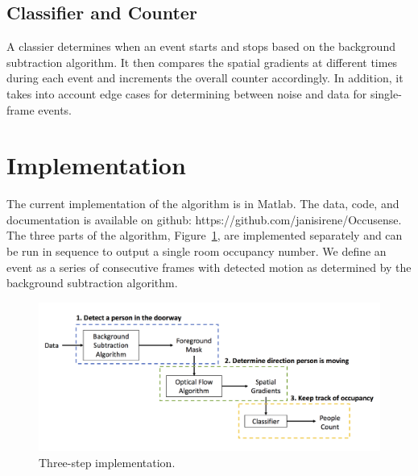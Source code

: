 \documentclass[12pt,oneside]{article} %
\begin{document}
\subsection{Classifier and Counter}
A classier determines when an event starts and stops based on the background subtraction algorithm. It then compares the spatial gradients at different times during each event and increments the overall counter accordingly. In addition, it takes into account edge cases for determining between noise and data for single-frame events.

\newpage

\section{Implementation}  %
The current implementation of the algorithm is in Matlab. The data, code, and documentation is available
on github: https://github.com/janisirene/Occusense.
 The three parts of the algorithm, Figure~\ref{threestep},
are implemented
separately and can be run in sequence to output a single room occupancy number. We define an event as a series of consecutive frames with detected motion as determined by the background subtraction algorithm.
\begin{figure}[htb] %
\centering
\includegraphics[scale=0.2]{images/threestep.png}
\caption{Three-step implementation.}
\label{threestep}
\end{figure}
\end{document}
